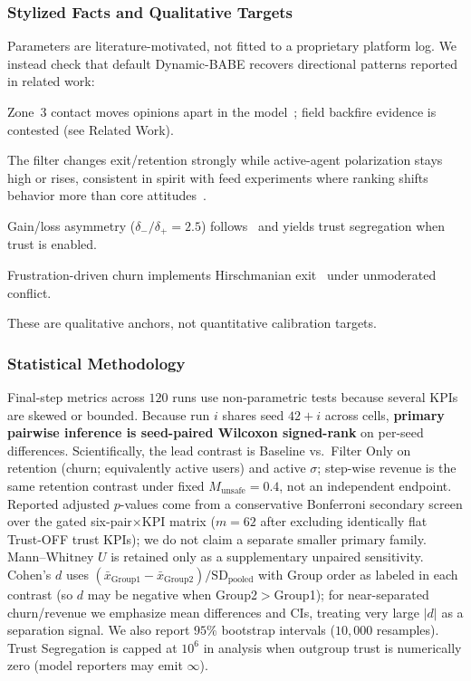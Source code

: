 \subsubsection{Stylized Facts and Qualitative Targets}
Parameters are literature-motivated, not fitted to a proprietary platform log. We instead check that default Dynamic-BABE recovers directional patterns reported in related work:
\begin{description*}
    \item[Rejection-zone repulsion.] Zone~3 contact moves opinions apart in the model~\citep{Sherif1961, Jager2005}; field backfire evidence is contested (see Related Work).
    \item[Feed regime vs.\ deep attitudes.] The filter changes exit/retention strongly while active-agent polarization stays high or rises, consistent in spirit with feed experiments where ranking shifts behavior more than core attitudes~\citep{Guess2023}.
    \item[Fragile trust.] Gain/loss asymmetry ($\delta_-/\delta_+ = 2.5$) follows~\citet{Slovic1993} and yields trust segregation when trust is enabled.
    \item[Exit under conflict.] Frustration-driven churn implements Hirschmanian exit~\citep{Hirschman1970} under unmoderated conflict.
\end{description*}
These are qualitative anchors, not quantitative calibration targets.

\subsubsection{Statistical Methodology}
Final-step metrics across $120$ runs use non-parametric tests because several KPIs are skewed or bounded. Because run $i$ shares seed $42+i$ across cells, \textbf{primary pairwise inference is seed-paired Wilcoxon signed-rank} on per-seed differences. Scientifically, the lead contrast is Baseline vs.\ Filter Only on retention (churn; equivalently active users) and active $\sigma$; step-wise revenue is the same retention contrast under fixed $M_{\mathrm{unsafe}}=0.4$, not an independent endpoint. Reported adjusted $p$-values come from a conservative Bonferroni secondary screen over the gated six-pair$\times$KPI matrix ($m=62$ after excluding identically flat Trust-OFF trust KPIs); we do not claim a separate smaller primary family. Mann--Whitney $U$ is retained only as a supplementary unpaired sensitivity. Cohen's $d$ uses $(\bar x_{\mathrm{Group1}}-\bar x_{\mathrm{Group2}})/\mathrm{SD}_{\mathrm{pooled}}$ with Group order as labeled in each contrast (so $d$ may be negative when Group2$>$Group1); for near-separated churn/revenue we emphasize mean differences and CIs, treating very large $|d|$ as a separation signal. We also report $95\%$ bootstrap intervals ($10{,}000$ resamples). Trust Segregation is capped at $10^{6}$ in analysis when outgroup trust is numerically zero (model reporters may emit $\infty$).

